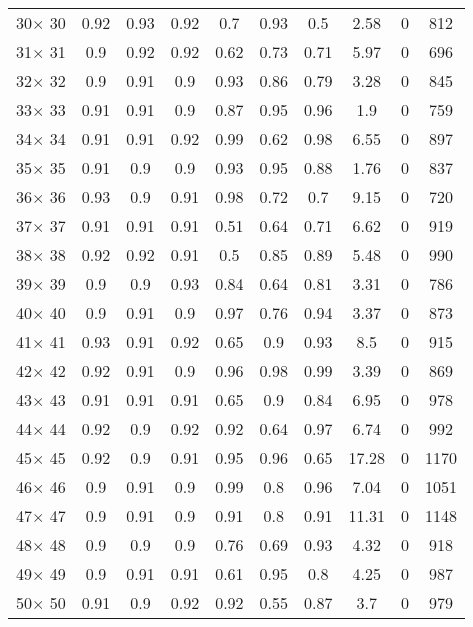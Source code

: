 \documentclass[main.tex]{subfiles}
\begin{document}
\begin{table}
\begin{tabular}{|c|c|c|c|c|c|c|c|c|c|}
30$\times$ 30 &0.92 &0.93 &0.92 &0.7 &0.93 &0.5 &2.58 &0 &812\\
31$\times$ 31 &0.9 &0.92 &0.92 &0.62 &0.73 &0.71 &5.97 &0 &696\\
32$\times$ 32 &0.9 &0.91 &0.9 &0.93 &0.86 &0.79 &3.28 &0 &845\\
33$\times$ 33 &0.91 &0.91 &0.9 &0.87 &0.95 &0.96 &1.9 &0 &759\\
34$\times$ 34 &0.91 &0.91 &0.92 &0.99 &0.62 &0.98 &6.55 &0 &897\\
35$\times$ 35 &0.91 &0.9 &0.9 &0.93 &0.95 &0.88 &1.76 &0 &837\\
36$\times$ 36 &0.93 &0.9 &0.91 &0.98 &0.72 &0.7 &9.15 &0 &720\\
37$\times$ 37 &0.91 &0.91 &0.91 &0.51 &0.64 &0.71 &6.62 &0 &919\\
38$\times$ 38 &0.92 &0.92 &0.91 &0.5 &0.85 &0.89 &5.48 &0 &990\\
39$\times$ 39 &0.9 &0.9 &0.93 &0.84 &0.64 &0.81 &3.31 &0 &786\\
40$\times$ 40 &0.9 &0.91 &0.9 &0.97 &0.76 &0.94 &3.37 &0 &873\\
41$\times$ 41 &0.93 &0.91 &0.92 &0.65 &0.9 &0.93 &8.5 &0 &915\\
42$\times$ 42 &0.92 &0.91 &0.9 &0.96 &0.98 &0.99 &3.39 &0 &869\\
43$\times$ 43 &0.91 &0.91 &0.91 &0.65 &0.9 &0.84 &6.95 &0 &978\\
44$\times$ 44 &0.92 &0.9 &0.92 &0.92 &0.64 &0.97 &6.74 &0 &992\\
45$\times$ 45 &0.92 &0.9 &0.91 &0.95 &0.96 &0.65 &17.28 &0 &1170\\
46$\times$ 46 &0.9 &0.91 &0.9 &0.99 &0.8 &0.96 &7.04 &0 &1051\\
47$\times$ 47 &0.9 &0.91 &0.9 &0.91 &0.8 &0.91 &11.31 &0 &1148\\
48$\times$ 48 &0.9 &0.9 &0.9 &0.76 &0.69 &0.93 &4.32 &0 &918\\
49$\times$ 49 &0.9 &0.91 &0.91 &0.61 &0.95 &0.8 &4.25 &0 &987\\
50$\times$ 50 &0.91 &0.9 &0.92 &0.92 &0.55 &0.87 &3.7 &0 &979\\
    \hline
    \end{tabular}
\end{table}
\end{document}
